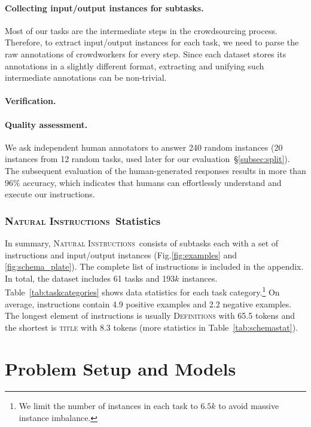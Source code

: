 \paragraph{Collecting input/output instances for subtasks.} Most of our tasks are the intermediate steps in the crowdsourcing process. Therefore, to extract input/output instances for each task, we need to parse the raw annotations of crowdworkers for every step. Since each dataset stores its annotations in a slightly different format, extracting and unifying such intermediate annotations can be non-trivial. 

\paragraph{Verification.} 

\paragraph{Quality assessment.} We ask independent human annotators to answer 240 random instances (20 instances from 12 random tasks, used later for our evaluation~\S\ref{subsec:split}). 
The subsequent evaluation of the human-generated responses results in more than 96\% accuracy, which indicates that humans can effortlessly understand and execute our instructions. 

\subsubsection{\textsc{Natural Instructions}\ Statistics}
\label{subsec:dataset:statistics}

In summary, \textsc{Natural Instructions}\ consists of  subtasks  each with a set of instructions and input/output instances (Fig.\ref{fig:examples} and \ref{fig:schema_plate}). The complete list of instructions is included in the appendix. In total, the dataset includes 61 tasks and 193$k$ instances.
Table~\ref{tab:taskcategories} shows data statistics for each task category.\footnote{We limit the number of instances in each task to $6.5k$ to avoid massive instance imbalance.} On average, instructions  contain 4.9 positive examples and 2.2 negative examples. The longest element of instructions is usually \textsc{Definitions} with 65.5 tokens and the shortest is \textsc{title} with 8.3 tokens (more statistics in Table~\ref{tab:schemastat}).

\section{Problem Setup and Models }
\label{subsec:setup}

